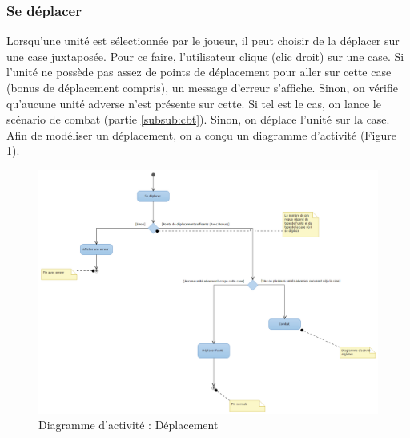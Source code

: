 \documentclass[a4paper,11pt]{article}
\begin{document}
\subsubsection{Se déplacer}
Lorsqu'une unité est sélectionnée par le joueur, il peut choisir de la déplacer sur une case juxtaposée. Pour ce faire, l'utilisateur clique (clic droit) sur une case. Si l'unité ne possède pas assez de points de déplacement pour aller sur cette case (bonus de déplacement compris), un message d'erreur s'affiche. Sinon, on vérifie qu'aucune unité adverse n'est présente sur cette. Si tel est le cas, on lance le scénario de combat (partie \ref{subsub:cbt}). Sinon, on déplace l'unité sur la case.\\
Afin de modéliser un déplacement, on a conçu un diagramme d'activité (Figure \ref{da:dep}).
\begin{figure}[H]
	\centering
	\includegraphics[width=\textwidth]{fig/diagramme_activite_deplacerUnite}
	\caption{Diagramme d'activité : Déplacement}
	\label{da:dep}
\end{figure}   
\end{document}
